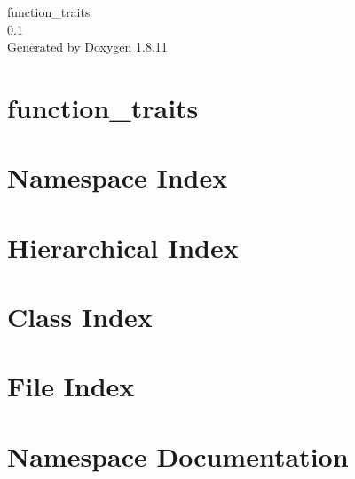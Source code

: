 \documentclass[twoside]{book}
\newcommand{\+}{\discretionary{\mbox{\scriptsize$\hookleftarrow$}}{}{}}
\newcommand{\clearemptydoublepage}{%
  \newpage{\pagestyle{empty}\cleardoublepage}%
}
\begin{document}
\hypersetup{pageanchor=false,
             bookmarksnumbered=true,
             pdfencoding=unicode
            }
\begin{titlepage}
\vspace*{7cm}
\begin{center}%
{\Large function\+\_\+traits \\[1ex]\large 0.\+1 }\\
\vspace*{1cm}
{\large Generated by Doxygen 1.8.11}\\
\end{center}
\end{titlepage}
\clearemptydoublepage
\tableofcontents
\clearemptydoublepage
{}
\hypersetup{pageanchor=true}

\chapter{function\+\_\+traits}
\label{index}\hypertarget{index}{}
\chapter{Namespace Index}

\chapter{Hierarchical Index}

\chapter{Class Index}

\chapter{File Index}

\chapter{Namespace Documentation}

\end{document}
